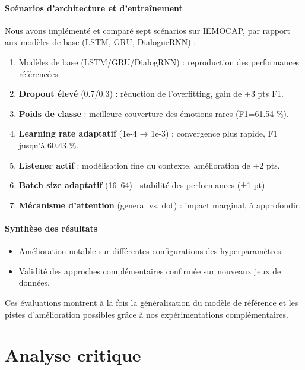 \documentclass[a4paper,11pt]{article}
\begin{document}
\paragraph{Scénarios d’architecture et d’entraînement}
Nous avons implémenté et comparé sept scénarios sur IEMOCAP, par rapport aux modèles de base (LSTM, GRU, DialogueRNN) :
\begin{enumerate}
  \item Modèles de base (LSTM/GRU/DialogRNN) : reproduction des performances référencées.
  \item \textbf{Dropout élevé} (0.7/0.3) : réduction de l’overfitting, gain de +3 pts F1.
  \item \textbf{Poids de classe} : meilleure couverture des émotions rares (F1=61.54 \%).
  \item \textbf{Learning rate adaptatif} (1e-4 → 1e-3) : convergence plus rapide, F1 jusqu’à 60.43 \%.
  \item \textbf{Listener actif} : modélisation fine du contexte, amélioration de +2 pts.
  \item \textbf{Batch size adaptatif} (16–64) : stabilité des performances (±1 pt).
  \item \textbf{Mécanisme d’attention} (general vs. dot) : impact marginal, à approfondir.
\end{enumerate}

\paragraph{Synthèse des résultats}
\begin{itemize}
  \item Amélioration notable sur différentes configurations des hyperparamètres.
  \item Validité des approches complémentaires confirmée sur nouveaux jeux de données.
\end{itemize}

Ces évaluations montrent à la fois la généralisation du modèle de référence et les pistes d’amélioration possibles grâce à nos expérimentations complémentaires.

\newpage

\section{Analyse critique}
\end{document}
